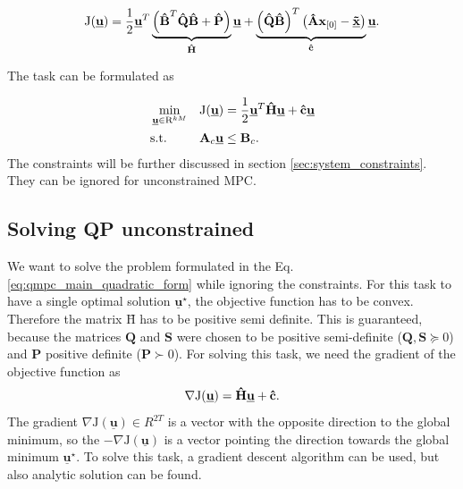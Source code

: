 \documentclass[a4paper,11pt,titlepage]{article}
\newcommand{\uvec}{\textbf{\underline{u}}}
\newcommand{\macJ}{\mathrm{J}(\uvec)}
\begin{document}
\begin{equation}
\mathrm{J}(\underline{\textbf{u}}) = \frac{1}{2}\uvec^T\underbrace{\left(\textbf{\^B}^T\textbf{\^Q}\textbf{\^B} + \textbf{\^P}\right)}_{\textbf{\^H}}\uvec + \underbrace{\left(\textbf{\^Q}\textbf{\^B}\right)^T\left(\textbf{\^A}\textbf{x}_{[0]} - \textbf{\underline{\~x}}\right)}_{\textbf{\^c}}\uvec.
\label{eq:mpc_objective_large}
\end{equation}

The task can be formulated as

\begin{equation}
\label{eq:qmpc_main_quadratic_form}
\begin{aligned}
& \min_{\uvec \in \mathrm{R}^{kM}}
& & \mathrm{J}(\uvec) = \frac{1}{2}\uvec^T\textbf{\^H}\uvec + \textbf{\^c} \uvec\\
& \text{s.t.}
& & \textbf{A}_c \uvec \leq \textbf{B}_c.
\end{aligned}
\end{equation}
The constraints will be further discussed in section \ref{sec:system_constraints}. They can be ignored for unconstrained MPC.

\subsection{Solving QP unconstrained}
We want to solve the problem formulated in the Eq. \ref{eq:qmpc_main_quadratic_form} while ignoring the constraints. For this task to have a single optimal solution $\underline{\textbf{u}}^{\star}$, the objective function has to be convex. Therefore the matrix $\textbf{\^H}$ has to be positive semi definite. This is guaranteed, because the matrices  $\textbf{Q}$ and $\textbf{S}$ were chosen to be positive semi-definite ($\textbf{Q}, \textbf{S} \succeq 0$) and $\textbf{P}$ positive definite ($\textbf{P} \succ 0$). For solving this task, we need the gradient of the objective function \cite{zometa2012implementation} as
\begin{equation}
\label{eq:J_grad}
\nabla\macJ = \textbf{\^H}\uvec + \textbf{\^c}.
\end{equation}
The gradient $\nabla\mathrm{J}(\underline{\textbf{u}}) \in R^{2T}$ is a vector with the opposite direction to the global minimum, so the $-\nabla\mathrm{J}(\underline{\textbf{u}})$ is a vector pointing the direction towards the global minimum $\underline{\textbf{u}}^{\star}$. To solve this task, a gradient descent algorithm can be used, but also analytic solution can be found.
\end{document}
